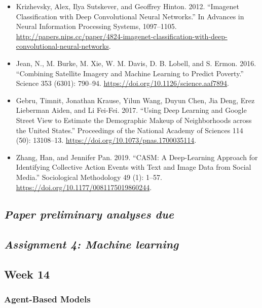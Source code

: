 \documentclass[
  10pt,
]{article}
\providecommand{\tightlist}{%
  \setlength{\itemsep}{0pt}\setlength{\parskip}{0pt}}
\begin{document}
\begin{itemize}
\tightlist
\item
  Krizhevsky, Alex, Ilya Sutskever, and Geoffrey Hinton. 2012.
  ``Imagenet Classification with Deep Convolutional Neural Networks.''
  In Advances in Neural Information Processing Systems, 1097--1105.
  \url{http://papers.nips.cc/paper/4824-imagenet-classification-with-deep-convolutional-neural-networks}.
\item
  Jean, N., M. Burke, M. Xie, W. M. Davis, D. B. Lobell, and S. Ermon.
  2016. ``Combining Satellite Imagery and Machine Learning to Predict
  Poverty.'' Science 353 (6301): 790--94.
  \url{https://doi.org/10.1126/science.aaf7894}.
\item
  Gebru, Timnit, Jonathan Krause, Yilun Wang, Duyun Chen, Jia Deng, Erez
  Lieberman Aiden, and Li Fei-Fei. 2017. ``Using Deep Learning and
  Google Street View to Estimate the Demographic Makeup of Neighborhoods
  across the United States.'' Proceedings of the National Academy of
  Sciences 114 (50): 13108--13.
  \url{https://doi.org/10.1073/pnas.1700035114}.
\item
  Zhang, Han, and Jennifer Pan. 2019. ``CASM: A Deep-Learning Approach
  for Identifying Collective Action Events with Text and Image Data from
  Social Media.'' Sociological Methodology 49 (1): 1--57.
  \url{https://doi.org/10.1177/0081175019860244}.
\end{itemize}

\hypertarget{paper-preliminary-analyses-due}{%
\subsection{\texorpdfstring{\emph{Paper preliminary analyses
due}}{Paper preliminary analyses due}}\label{paper-preliminary-analyses-due}}

\hypertarget{assignment-4-machine-learning}{%
\subsection{\texorpdfstring{\emph{Assignment 4: Machine
learning}}{Assignment 4: Machine learning}}\label{assignment-4-machine-learning}}

\hypertarget{week-14}{%
\subsection{Week 14}\label{week-14}}

\hypertarget{agent-based-models}{%
\subsubsection{Agent-Based Models}\label{agent-based-models}}
\end{document}
